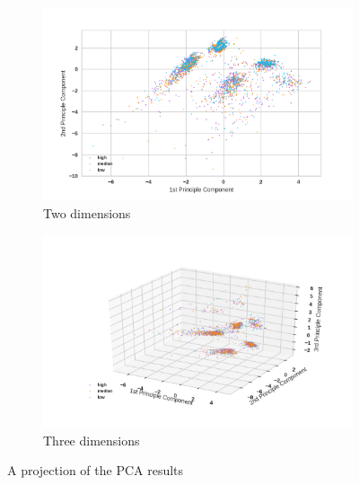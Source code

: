 \documentclass[12pt]{article}
\begin{document}
\begin{figure}
    \centering
    \begin{subfigure}[b]{0.48\textwidth}
        \includegraphics[width=\textwidth]{images/pca2-2d.png}
        \caption{Two dimensions}
        \label{fig:pca2-2d}
    \end{subfigure}
    \begin{subfigure}[b]{0.48\textwidth}
        \includegraphics[width=\textwidth]{images/pca2-3d.png}
        \caption{Three dimensions}
        \label{fig:pca2-3d}
    \end{subfigure}
    \caption{A projection of the PCA results}
\end{figure}
\end{document}
